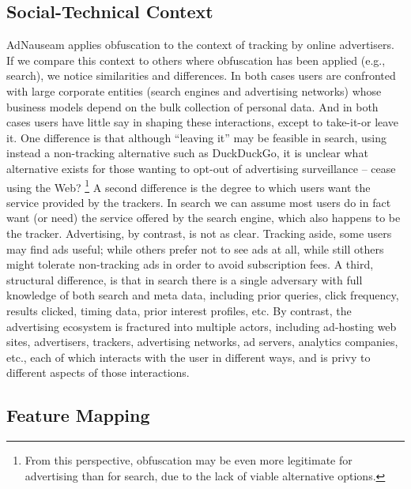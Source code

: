 \documentclass[conference]{IEEEtran}
\begin{document}
\subsection{Social-Technical Context}

AdNauseam applies obfuscation to the context of tracking by online advertisers. If we compare this context to others where obfuscation has been applied (e.g., search), we notice similarities and differences. In both cases users are confronted with large corporate entities (search engines and advertising networks) whose business models depend on the bulk collection of personal data. And in both cases users have little say in shaping these interactions, except to take-it-or leave it. One difference is that although “leaving it” may be feasible in search, using instead a non-tracking alternative such as DuckDuckGo, it is unclear what alternative exists for those wanting to opt-out of advertising surveillance – cease using the Web? \footnote{From this perspective, obfuscation may be even more legitimate for advertising than for search, due to the lack of viable alternative options.} A second difference is the degree to which users want the service provided by the trackers. In search we can assume most users do in fact want (or need) the service offered by the search engine, which also happens to be the tracker. Advertising, by contrast, is not as clear. Tracking aside, some users may find ads useful; while others prefer not to see ads at all, while still others might tolerate non-tracking ads in order to avoid subscription fees. A third, structural difference, is that in search there is a single adversary with full knowledge of both search and meta data, including prior queries, click frequency, results clicked, timing data, prior interest profiles, etc. By contrast, the advertising ecosystem is fractured into multiple actors, including ad-hosting web sites, advertisers, trackers, advertising networks, ad servers, analytics companies, etc., each of which interacts with the user in different ways, and is privy to different aspects of those interactions.

\subsection{Feature Mapping}
\end{document}
